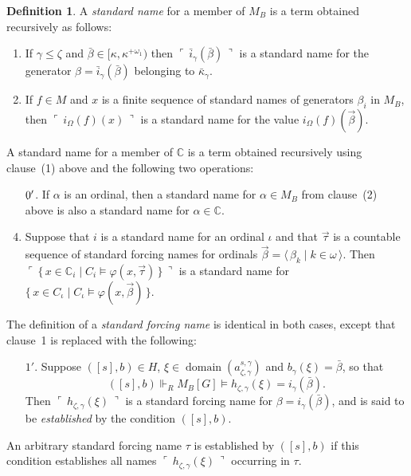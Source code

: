 \documentclass[
twoside,
]{article}
\theoremstyle{definition}
\newtheorem{definition}[theorem]{Definition}
\theoremstyle{remark}
\newcommand{\gn}[1]{\ulcorner\, #1\,\urcorner}
\newcommand{\forceKappa}{\bar\kappa} %
\newcommand{\ords}{\Omega}
\newcommand{\forces}{\Vdash}
\renewcommand{\phi}{\varphi}
\newcommand{\set}[1]{\{\,#1\,\}}
\newcommand{\pair}[1]{\langle#1\rangle}
\newcommand{\seq}[1]{\pair{\,#1\,}}
\DeclareMathOperator{\domain}{domain}
\newcommand\chang{\mathbb{C}}
\begin{document}
  \begin{definition}
    \label{def:standard-names}
    A  \emph{standard name} for a member of $M_B$ is a term
    obtained recursively as follows:
    \begin{enumerate}
    \item\label{item:stdname_MB_gen}
      If $\gamma\leq\zeta$ and $\bar\beta\in
      [\kappa,\kappa^{+\omega_1})$ then $\gn{\bar
        i_{\gamma}(\bar\beta)}$ is a standard name for the generator
      $\beta=\bar i_{\gamma}(\bar\beta)$ belonging to $\forceKappa_{\gamma}$.
      
    \item \label{item:stdname_MB_fctn}
      If $f\in M$ and $x$ is a finite sequence  of standard
      names of  generators $\beta_i$ in $M_B$, then  $\gn{i_{\ords}(f)(x)}$ is 
      a standard name for the value $i_{\ords}(f)(\vec{\beta})$.
    \end{enumerate}
    
    A standard name for a member of $\chang$ is a term obtained
    recursively using clause~(1) above and the following two operations:
    \begin{enumerate}
      \setcounter{enumi}{2}

      \item[$\arabic{enumi}'$.]  \label{item:stdname_C_fctn}
      If $\alpha$ is an ordinal, then a standard name for
      $\alpha\in M_B$ from clause~(2) above is also a standard name for $\alpha\in\chang$.
      
    \item\label{item:stdname_C_recur}
     Suppose that $i$ is a standard name for an ordinal $\iota$ and
     that  $\vec\tau$ is a countable sequence of standard forcing
     names for ordinals $\vec\beta=\seq{\beta_k\mid k\in\omega}$.
       Then 
      $\gn{\set{x\in\chang_{i}\mid
          C_i\models\phi(x,\vec\tau)}}$ is a standard name for $\set{x\in
        C_{\iota}\mid C_\iota\models \phi(x,\vec\beta)}$. 
    \end{enumerate}
    
    The definition of a  \emph{standard forcing name} is identical in
    both cases, 
    except that clause~1 is replaced with the following:
    \begin{enumerate}
    \item[$1'$.]
      Suppose $([s],b)\in H$,
      $\xi\in\domain(a^{s,\gamma}_{\zeta,\gamma})$ and
      $b_{\gamma}(\xi)=\bar \beta$, so 
      that
      \begin{equation*}
        ([s],b)\forces_{R} M_B[G]\models h_{\zeta,\gamma}(\xi)=i_{\gamma}(\bar\beta).
      \end{equation*}
      Then $\gn{h_{\zeta,\gamma}(\xi)}$ is a standard forcing name for
      $\beta=i_{\gamma}(\bar\beta)$, and is said to be
      \emph{established} by the condition $([s],b)$.
    \end{enumerate}
    An arbitrary  standard forcing name $\tau$ is established by $([s],b)$ if
    this condition establishes all names $\gn{h_{\zeta,\gamma}(\xi)}$ occurring in $\tau$.
  \end{definition}
\end{document}
